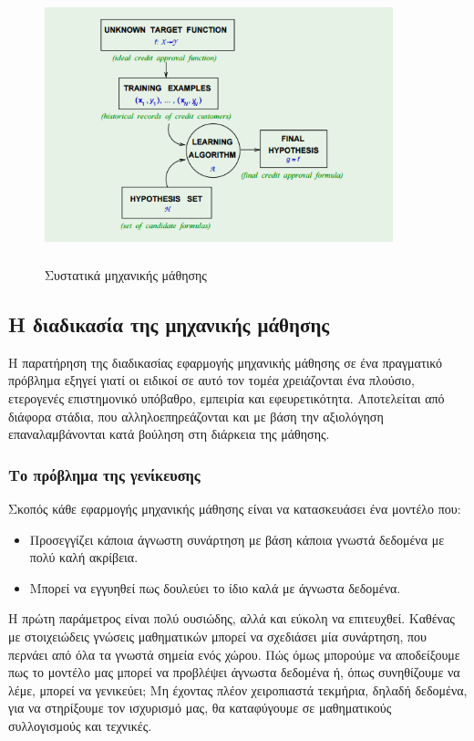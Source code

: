 \documentclass{article}
\begin{document}
 \begin{figure}[H]
	\centering			
    \includegraphics[width=0.9\textwidth,height=8cm]{learning.png}
    \caption[Συστατικά μηχανικής μάθησης]{Συστατικά μηχανικής μάθησης}
 \end{figure}

\subsection{Η διαδικασία της μηχανικής μάθησης}
Η παρατήρηση της διαδικασίας εφαρμογής μηχανικής μάθησης σε ένα πραγματικό πρόβλημα εξηγεί γιατί οι ειδικοί σε αυτό τον τομέα χρειάζονται ένα πλούσιο, ετερογενές επιστημονικό υπόβαθρο, εμπειρία και εφευρετικότητα. Αποτελείται από διάφορα στάδια, που αλληλοεπηρεάζονται και με βάση την αξιολόγηση επαναλαμβάνονται κατά βούληση στη διάρκεια της μάθησης.
\subsubsection{Το πρόβλημα της γενίκευσης}
Σκοπός κάθε εφαρμογής μηχανικής μάθησης είναι να κατασκευάσει ένα μοντέλο που:
\begin{itemize}
\item Προσεγγίζει κάποια άγνωστη συνάρτηση με βάση κάποια γνωστά δεδομένα με πολύ καλή ακρίβεια.
\item Μπορεί να εγγυηθεί πως δουλεύει το ίδιο καλά με άγνωστα δεδομένα.
\end{itemize}

Η πρώτη παράμετρος είναι πολύ ουσιώδης, αλλά και εύκολη να επιτευχθεί. Καθένας με στοιχειώδεις γνώσεις μαθηματικών μπορεί να σχεδιάσει μία συνάρτηση, που περνάει από όλα τα γνωστά σημεία ενός χώρου. Πώς όμως μπορούμε να αποδείξουμε πως το μοντέλο μας μπορεί να προβλέψει άγνωστα δεδομένα ή, όπως συνηθίζουμε να λέμε, μπορεί να γενικεύει; Μη έχοντας πλέον χειροπιαστά τεκμήρια, δηλαδή δεδομένα, για να στηρίξουμε τον ισχυρισμό μας, θα καταφύγουμε σε μαθηματικούς συλλογισμούς και
τεχνικές.
\end{document}
